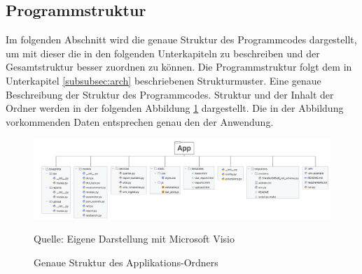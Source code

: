 \subsection{Programmstruktur}
\label{subsec:programmstruktur}


Im folgenden Abschnitt wird die genaue Struktur des Programmcodes dargestellt, um mit dieser die in den folgenden
Unterkapiteln zu beschreiben und der Gesamtstruktur besser zuordnen zu können.
Die Programmstruktur folgt dem in Unterkapitel \ref{subsubsec:arch} beschriebenen Strukturmuster.
Eine genaue Beschreibung der Struktur des Programmcodes.
Struktur und der Inhalt der Ordner werden in der folgenden Abbildung \ref{fig: Genaue Struktur des Applikations-Ordners} dargestellt.
Die in der Abbildung vorkommenden Daten entsprechen genau den der Anwendung.


\begin{figure}[H]
    \centering
    \includegraphics[width=1\textwidth]{Grafiken/Min Ordnerstruktur Projekt.png}
    \caption{Genaue Struktur des Applikations-Ordners}
    \label{fig: Genaue Struktur des Applikations-Ordners}
    {Quelle: Eigene Darstellung mit Microsoft Visio}
\end{figure}